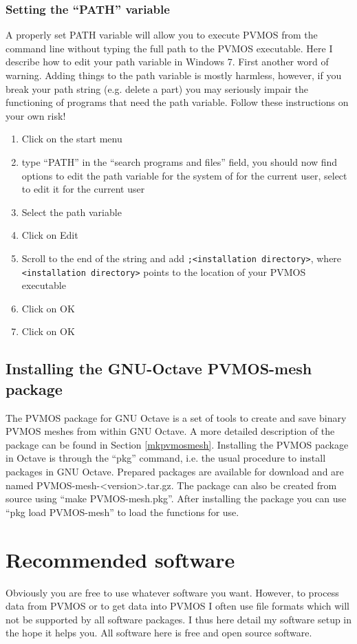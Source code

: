\documentclass[noshowpacs,preprintnumbers,amsmath,amssymb, letter]{revtex4}
\begin{document}
\subsubsection{Setting the ``PATH'' variable}
A properly set PATH variable will allow you to execute PVMOS from the command line without typing the full path to the PVMOS executable. Here I describe how to edit your path variable in Windows 7. First another word of warning. Adding things to the path variable is mostly harmless, however, if you break your path string (e.g. delete a part) you may seriously impair the functioning of programs that need the path variable. Follow these instructions on your own risk!
\begin{enumerate}
\item{} Click on the start menu 
\item{} type ``PATH'' in the ``search programs and files'' field, you should now find options to edit the path variable for the system of for the current user, select to edit it for the current user
\item{} Select the path variable
\item{} Click on Edit
\item{} Scroll to the end of the string and add \texttt{;<installation directory>}, where \texttt{<installation directory>} points to the location of your PVMOS executable
\item{} Click on OK
\item{} Click on OK
\end{enumerate}

\subsection{Installing the GNU-Octave PVMOS-mesh package}
The PVMOS package for GNU Octave is a set of tools to create and save binary PVMOS meshes from within GNU Octave. A more detailed description of the package can be found in Section \ref{mkpvmosmesh}. Installing the PVMOS package in Octave is through the ``pkg'' command, i.e. the usual procedure to install packages in GNU Octave. Prepared packages are available for download and are named PVMOS-mesh-<version>.tar.gz. The package can also be created from source using ``make PVMOS-mesh.pkg''. After installing the package you can use ``pkg load PVMOS-mesh'' to load the functions for use.

\section{Recommended software}
Obviously you are free to use whatever software you want. However, to process data from PVMOS or to get data into PVMOS I often use file formats which will not be supported by all software packages. I thus here detail my software setup in the hope it helps you. All software here is free and open source software.
\end{document}
